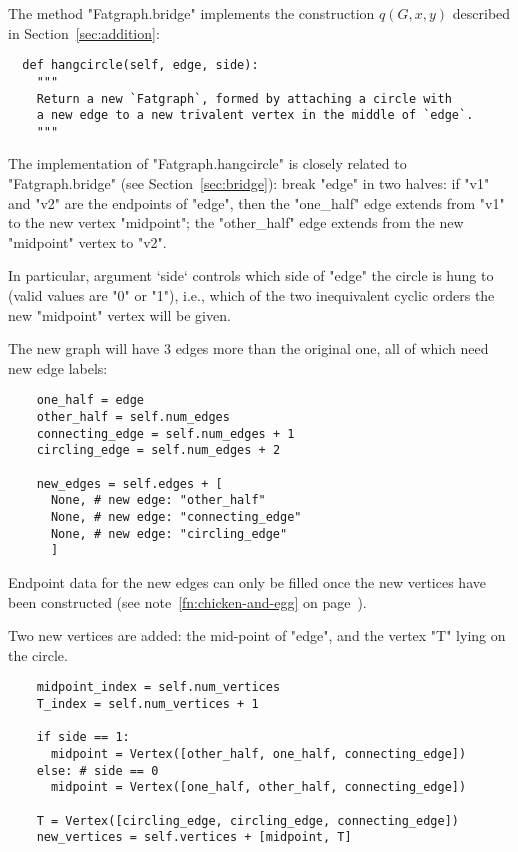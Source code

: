 The method "Fatgraph.bridge" implements the construction $q(G,x,y)$
described in Section~\ref{sec:addition}:
\begin{lstlisting}
  def hangcircle(self, edge, side):
    """
    Return a new `Fatgraph`, formed by attaching a circle with
    a new edge to a new trivalent vertex in the middle of `edge`.
    """
\end{lstlisting}
The implementation of "Fatgraph.hangcircle" is closely related to
"Fatgraph.bridge" (see Section~\ref{sec:bridge}): break "edge" in two
halves: if "v1" and "v2" are the endpoints of "edge", then the
"one_half" edge extends from "v1" to the new vertex "midpoint"; the
"other_half" edge extends from the new "midpoint" vertex to "v2".

In particular, argument `side` controls which side of "edge" the
circle is hung to (valid values are "0" or "1"), i.e., which of the
two inequivalent cyclic orders the new "midpoint" vertex will be
given.

The new graph will have 3 edges more than the original one, all of
which need new edge labels:
\begin{lstlisting}
    one_half = edge
    other_half = self.num_edges
    connecting_edge = self.num_edges + 1
    circling_edge = self.num_edges + 2
    
    new_edges = self.edges + [
      None, # new edge: "other_half"
      None, # new edge: "connecting_edge"
      None, # new edge: "circling_edge"
      ]
\end{lstlisting}
Endpoint data for the new edges can only be filled once the new
vertices have been constructed (see note~\ref{fn:chicken-and-egg} on
page~\pageref{fn:chicken-and-egg}).%

Two new vertices are added: the mid-point of "edge", and
the vertex "T" lying on the circle.
\begin{lstlisting}
    midpoint_index = self.num_vertices
    T_index = self.num_vertices + 1

    if side == 1:
      midpoint = Vertex([other_half, one_half, connecting_edge])
    else: # side == 0
      midpoint = Vertex([one_half, other_half, connecting_edge])

    T = Vertex([circling_edge, circling_edge, connecting_edge])
    new_vertices = self.vertices + [midpoint, T]

\end{lstlisting}

